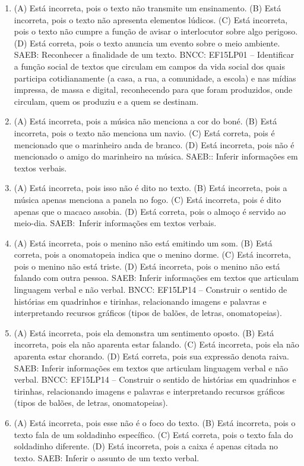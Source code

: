 \begin{enumerate}
\item
(A) Está incorreta, pois o texto não transmite um ensinamento.
(B) Está incorreta, pois o texto não apresenta elementos lúdicos.
(C) Está incorreta, pois o texto não cumpre a função de avisar o interlocutor sobre algo perigoso.
(D) Está correta, pois o texto anuncia um evento sobre o meio ambiente.
SAEB: Reconhecer a finalidade de um texto.
BNCC: EF15LP01 -- Identificar a função social de textos que
circulam em campos da vida social dos quais participa cotidianamente (a
casa, a rua, a comunidade, a escola) e nas mídias impressa, de massa e
digital, reconhecendo para que foram produzidos, onde circulam, quem os
produziu e a quem se destinam.

\item
(A) Está incorreta, pois a música não menciona a cor do boné.
(B) Está incorreta, pois o texto não menciona um navio.
(C) Está correta, pois é mencionado que o marinheiro anda de branco.
(D) Está incorreta, pois não é mencionado o amigo do marinheiro na música.
SAEB:: Inferir informações em textos verbais.

\item
(A) Está incorreta, pois isso não é dito no texto.
(B) Está incorreta, pois a música apenas menciona a panela no fogo.
(C) Está incorreta, pois é dito apenas que o macaco assobia.
(D) Está correta, pois o almoço é servido ao meio-dia.
SAEB:~Inferir informações em textos verbais.

\item
(A) Está incorreta, pois o menino não está emitindo um som.
(B) Está correta, pois a onomatopeia indica que o menino dorme.
(C) Está incorreta, pois o menino não está triste.
(D) Está incorreta, pois o menino não está falando com outra pessoa.
SAEB: Inferir informações em textos que articulam linguagem verbal e não verbal.
BNCC: EF15LP14 -- Construir o sentido de histórias em quadrinhos
e tirinhas, relacionando imagens e palavras e interpretando recursos
gráficos (tipos de balões, de letras, onomatopeias).

\item
(A) Está incorreta, pois ela demonstra um sentimento oposto.
(B) Está incorreta, pois ela não aparenta estar falando.
(C) Está incorreta, pois ela não aparenta estar chorando.
(D) Está correta, pois sua expressão denota raiva.
SAEB: Inferir informações em textos que articulam linguagem verbal e não verbal.
BNCC: EF15LP14 -- Construir o sentido de histórias em quadrinhos e tirinhas, relacionando imagens e palavras e interpretando recursos gráficos (tipos de balões, de letras, onomatopeias).

\item
(A) Está incorreta, pois esse não é o foco do texto.
(B) Está incorreta, pois o texto fala de um soldadinho específico.
(C) Está correta, pois o texto fala do soldadinho diferente.
(D) Está incorreta, pois a caixa é apenas citada no texto.
SAEB: Inferir o assunto de um texto verbal.
\end{enumerate}

